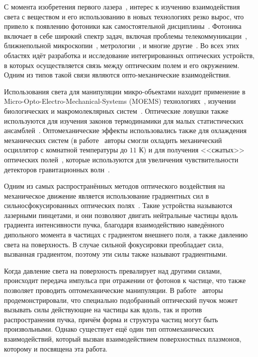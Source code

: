 \intro
С момента изобретения первого лазера~\cite{maiman1960stimulated}, интерес к изучению взаимодействия света с веществом и его использованию в новых технологиях резко вырос, что привело к появлению фотоники как самостоятельной дисциплины~\cite{lifante2003integrated}. Фотоника включает в себе широкий спектр задач, включая проблемы
 телекоммуникации~\cite{agrawal2012fiber},
 ближнепольной микроскопии~\cite{betzig1992near},
 метрологии~\cite{kim2009metrology},
и многие другие~\cite{saleh2019fundamentals}. Во всех этих областях идёт разработка и исследование интегрированных оптических устройств, в которых осуществляется связь между оптическим полем и его окружением.  Одним из типов такой связи являются опто-механические взаимодействия. 

Использования света для манипуляции микро-объектами находит применение в Micro-Opto-Electro-Mechanical-Systems (MOEMS) технологиях~\cite{motamedi1994micro}, изучении биологических и макромолеклярных систем~\cite{Ashkin1517,grier2003revolution}. Оптические ловушки также используются для изучения законов термодинамики для малых статистических ансамблей~\cite{wang2002experimental}. Оптомеханические эффекты использовались также для охлаждения механических систем (в работе~\cite{schliesser2006radiation} авторы смогли охладить механический осциллятор с комнатной температуры до $11$ К) и для получения <<сжатых>> оптических полей~\cite{fabre1994quantum}, которые используются для увеличения чувствительности детекторов гравитационных волн~\cite{aasi2013enhanced}.

Одним из самых распространённых методов оптического воздействия на механическое движение является использование градиентных  сил в сильносфокусированных оптических полях~\cite{ashkin1986observation}. Такие устройства называются лазерными пинцетами, и они позволяют двигать нейтральные частицы вдоль градиента интенсивности пучка, благодаря взаимодействию наведённого дипольного момента в частицах с градиентом внешнего поля, а также давлению света на поверхность. В случае сильной фокусировки преобладает сила, вызванная градиентом, поэтому эти силы также называют градиентными.

Когда давление света на поверхность превалирует над другими силами, происходит передача импульса при отражении от фотонов к частице, что также позволяет проводить оптомеханические манипуляции. В работе~\cite{sukhov2011negative} авторы продемонстрировали, что специально подобранный оптический пучок может вызывать силы действующие на частицы как вдоль, так и против распространения пучка, причём форма и структура частиц могут быть произвольными. Однако существует ещё один тип оптомеханических взаимодействий, который вызван взаимодействием поверхностных плазмонов, которому и посвящена эта работа.

